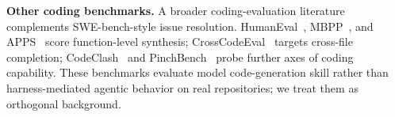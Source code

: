 
\textbf{Other coding benchmarks.}
A broader coding-evaluation literature complements SWE-bench-style issue resolution. HumanEval~\cite{humaneval}, MBPP~\cite{mbpp}, and APPS~\cite{apps} score function-level synthesis; CrossCodeEval~\cite{crosscodeeval} targets cross-file completion; CodeClash~\cite{codeclash} and PinchBench~\cite{pinchbench} probe further axes of coding capability. These benchmarks evaluate model code-generation skill rather than harness-mediated agentic behavior on real repositories; we treat them as orthogonal background.
